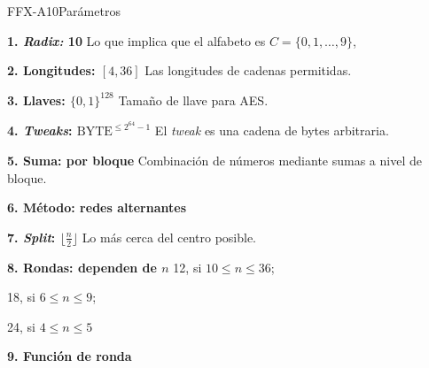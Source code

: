 \begin{frame}{FFX-A10}{Parámetros}

  {
    \begin{block}{\textbf{1. \textit{Radix:} 10}}
      Lo que implica que el alfabeto es $ C = \{ 0, 1, \dots, 9 \} $,
    \end{block}

    \begin{block}{\textbf{2. Longitudes: $ [ 4, 36 ] $}}
      Las longitudes de cadenas permitidas.
    \end{block}

    \begin{block}{\textbf{3. Llaves: $ \{ 0, 1\}^{128} $}}
      Tamaño de llave para AES.
    \end{block}
  }

  {
    \begin{block}{\textbf{4. \textit{Tweaks}: $ \text{BYTE}^{\leq 2^{64} - 1} $}}
      El \textit{tweak} es una cadena de bytes arbitraria.
    \end{block}

    \begin{block}{\textbf{5. Suma: por bloque}}
      Combinación de números mediante sumas a nivel de bloque.
    \end{block}

    \begin{block}{\textbf{6. Método: redes alternantes}}
    \end{block}
  }

  {
    \begin{block}{\textbf{7. \textit{Split}: $ \lfloor \frac{n}{2} \rfloor $ }}
      Lo más cerca del centro posible.
    \end{block}

    \begin{block}{\textbf{8. Rondas: dependen de $ n $}}
      12, si $ 10 \leq n \leq 36 $; \par
      18, si $ 6 \leq n \leq 9 $; \par
      24, si $ 4 \leq n \leq 5 $
    \end{block}
  }

  {
    \begin{block}{\textbf{9. Función de ronda}}

    \end{block}
  }

\end{frame}